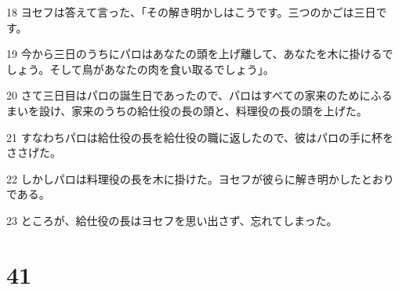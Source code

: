 \par 18 ヨセフは答えて言った、「その解き明かしはこうです。三つのかごは三日です。
\par 19 今から三日のうちにパロはあなたの頭を上げ離して、あなたを木に掛けるでしょう。そして鳥があなたの肉を食い取るでしょう」。
\par 20 さて三日目はパロの誕生日であったので、パロはすべての家来のためにふるまいを設け、家来のうちの給仕役の長の頭と、料理役の長の頭を上げた。
\par 21 すなわちパロは給仕役の長を給仕役の職に返したので、彼はパロの手に杯をささげた。
\par 22 しかしパロは料理役の長を木に掛けた。ヨセフが彼らに解き明かしたとおりである。
\par 23 ところが、給仕役の長はヨセフを思い出さず、忘れてしまった。

\chapter{41}

